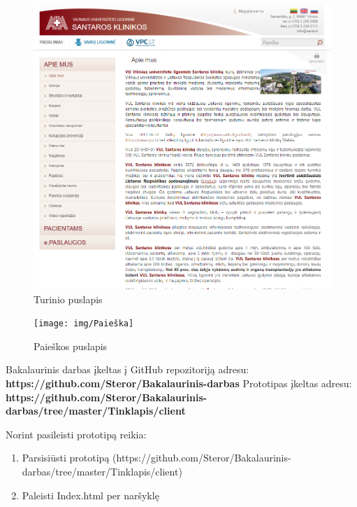 \documentclass{VUMIFPSbakalaurinis}
\begin{document}
\begin{figure}[H]
    \centering
    \includegraphics[scale=0.65]{img/Turinys}
    \caption{Turinio puslapis}
    \label{img:TurinysPuslapis}
\end{figure}
\begin{figure}[H]
    \centering
    \texttt{[image: img/Paieška]}
    \caption{Paieškos puslapis}
    \label{img:PaieškaPuslapis}
\end{figure}

Bakalaurinis darbas įkeltas į GitHub repozitoriją adresu: \textbf{https://github.com/Steror/Bakalaurinis-darbas}
Prototipas įkeltas adresu: \textbf{https://github.com/Steror/Bakalaurinis-darbas/tree/master/Tinklapis/client}

Norint pasileisti prototipą reikia:
\begin{enumerate}
	\item Parsisiūsti prototipą (https://github.com/Steror/Bakalaurinis-darbas/tree/master/Tinklapis/client)
	\item Paleisti Index.html per naršyklę
\end{enumerate}
\end{document}
